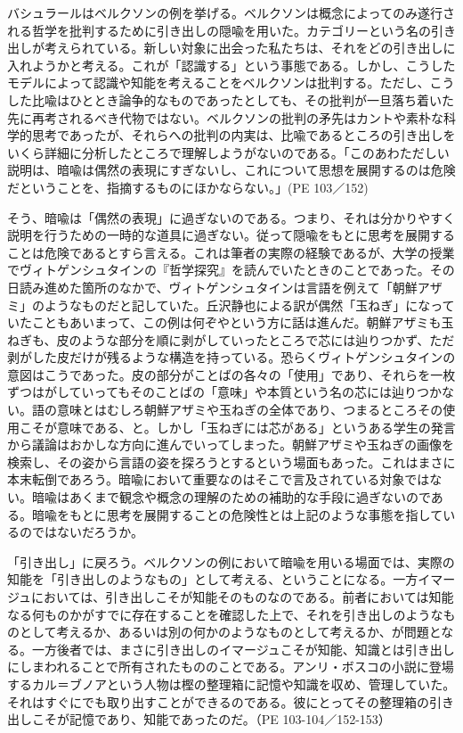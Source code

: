 \documentclass[b5j,twoside,twocolumn]{utarticle}
\begin{document}
バシュラールはベルクソンの例を挙げる。ベルクソンは概念によってのみ遂行される哲学を批判するために引き出しの隠喩を用いた。カテゴリーという名の引き出しが考えられている。新しい対象に出会った私たちは、それをどの引き出しに入れようかと考える。これが「認識する」という事態である。しかし、こうしたモデルによって認識や知能を考えることをベルクソンは批判する。ただし、こうした比喩はひととき論争的なものであったとしても、その批判が一旦落ち着いた先に再考されるべき代物ではない。ベルクソンの批判の矛先はカントや素朴な科学的思考であったが、それらへの批判の内実は、比喩であるところの引き出しをいくら詳細に分析したところで理解しようがないのである。「このあわただしい説明は、暗喩は偶然の表現にすぎないし、これについて思想を展開するのは危険だということを、指摘するものにほかならない。」(PE 103／152)


そう、暗喩は「偶然の表現」に過ぎないのである。つまり、それは分かりやすく説明を行うための一時的な道具に過ぎない。従って隠喩をもとに思考を展開することは危険であるとすら言える。これは筆者の実際の経験であるが、大学の授業でヴィトゲンシュタインの『哲学探究』を読んでいたときのことであった。その日読み進めた箇所のなかで、ヴィトゲンシュタインは言語を例えて「朝鮮アザミ」のようなものだと記していた。丘沢静也による訳が偶然「玉ねぎ」になっていたこともあいまって、この例は何ぞやという方に話は進んだ。朝鮮アザミも玉ねぎも、皮のような部分を順に剥がしていったところで芯には辿りつかず、ただ剥がした皮だけが残るような構造を持っている。恐らくヴィトゲンシュタインの意図はこうであった。皮の部分がことばの各々の「使用」であり、それらを一枚ずつはがしていってもそのことばの「意味」や本質という名の芯には辿りつかない。語の意味とはむしろ朝鮮アザミや玉ねぎの全体であり、つまるところその使用こそが意味である、と。しかし「玉ねぎには芯がある」というある学生の発言から議論はおかしな方向に進んでいってしまった。朝鮮アザミや玉ねぎの画像を検索し、その姿から言語の姿を探ろうとするという場面もあった。これはまさに本末転倒であろう。暗喩において重要なのはそこで言及されている対象ではない。暗喩はあくまで観念や概念の理解のための補助的な手段に過ぎないのである。暗喩をもとに思考を展開することの危険性とは上記のような事態を指しているのではないだろうか。


「引き出し」に戻ろう。ベルクソンの例において暗喩を用いる場面では、実際の知能を「引き出しのようなもの」として考える、ということになる。一方イマージュにおいては、引き出しこそが知能そのものなのである。前者においては知能なる何ものかがすでに存在することを確認した上で、それを引き出しのようなものとして考えるか、あるいは別の何かのようなものとして考えるか、が問題となる。一方後者では、まさに引き出しのイマージュこそが知能、知識とは引き出しにしまわれることで所有されたもののことである。アンリ・ボスコの小説に登場するカル＝ブノアという人物は樫の整理箱に記憶や知識を収め、管理していた。それはすぐにでも取り出すことができるのである。彼にとってその整理箱の引き出しこそが記憶であり、知能であったのだ。（PE 103-104／152-153）
\end{document}
